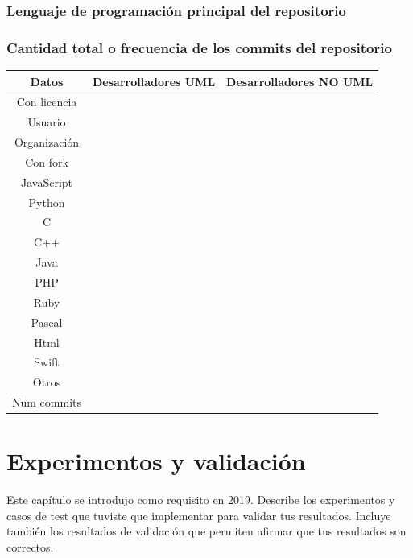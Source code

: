 \documentclass[a4paper, 12pt]{book}
\begin{document}
\subsection{Lenguaje de programación principal del repositorio} %
\label{sec:lenguaje de programación principal del repositorio}




\subsection{Cantidad total o frecuencia de los commits del repositorio} %
\label{sec:cantidad total o frecuencia de los commits del del repositorio}




\begin{tabular}{|c|c|c|}
  \hline
  Datos & Desarrolladores UML & Desarrolladores NO UML\\
  \hline
  Con licencia &  &  \\
  Usuario &  & \\
  Organización &  & \\
  Con fork &  & \\
  JavaScript &  & \\
  Python &  & \\
  C &  & \\
  C++ &  & \\
  Java &  & \\
  PHP &  & \\
  Ruby &  & \\
  Pascal &  & \\
  Html &  & \\
  Swift &  & \\
  Otros &  & \\
  Num commits &  & \\
  \hline
  \end{tabular}


\cleardoublepage
\chapter{Experimentos y validación}
\label{chap:experimentos}
Este capítulo se introdujo como requisito en 2019. 
Describe los experimentos y casos de test que tuviste que implementar para validar tus resultados. 
Incluye también los resultados de validación que permiten afirmar que tus resultados son correctos. 
\end{document}

